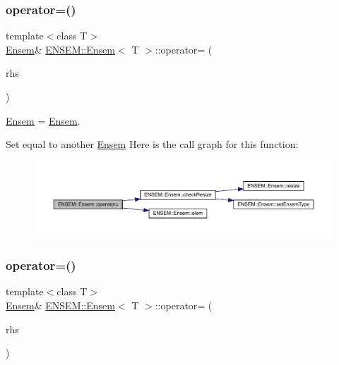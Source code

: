 \subsubsection{\texorpdfstring{operator=()}{operator=()}\hspace{0.1cm}{\footnotesize\ttfamily [11/15]}}
{\footnotesize\ttfamily template$<$class T$>$ \\
\mbox{\hyperlink{classENSEM_1_1Ensem}{Ensem}}\& \mbox{\hyperlink{classENSEM_1_1Ensem}{E\+N\+S\+E\+M\+::\+Ensem}}$<$ T $>$\+::operator= (\begin{DoxyParamCaption}\item[{const \mbox{\hyperlink{classENSEM_1_1Ensem}{Ensem}}$<$ T $>$ \&}]{rhs }\end{DoxyParamCaption})\hspace{0.3cm}{\ttfamily [inline]}}



\mbox{\hyperlink{classENSEM_1_1Ensem}{Ensem}} = \mbox{\hyperlink{classENSEM_1_1Ensem}{Ensem}}. 

Set equal to another \mbox{\hyperlink{classENSEM_1_1Ensem}{Ensem}} Here is the call graph for this function\+:
\nopagebreak
\begin{figure}[H]
\begin{center}
\leavevmode
\includegraphics[width=350pt]{d7/d3e/classENSEM_1_1Ensem_a2f4f881dde88dfaf425051580e477e6c_cgraph}
\end{center}
\end{figure}
\mbox{\label{classENSEM_1_1Ensem_a2f4f881dde88dfaf425051580e477e6c}} 
\subsubsection{\texorpdfstring{operator=()}{operator=()}\hspace{0.1cm}{\footnotesize\ttfamily [12/15]}}
{\footnotesize\ttfamily template$<$class T$>$ \\
\mbox{\hyperlink{classENSEM_1_1Ensem}{Ensem}}\& \mbox{\hyperlink{classENSEM_1_1Ensem}{E\+N\+S\+E\+M\+::\+Ensem}}$<$ T $>$\+::operator= (\begin{DoxyParamCaption}\item[{const \mbox{\hyperlink{classENSEM_1_1Ensem}{Ensem}}$<$ T $>$ \&}]{rhs }\end{DoxyParamCaption})\hspace{0.3cm}{\ttfamily [inline]}}



